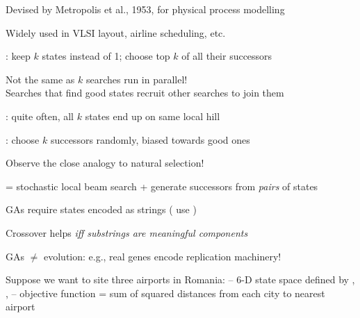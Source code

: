 \documentclass{article}
\begin{document}
\begin{huge}

Devised by Metropolis et al., 1953, for physical process modelling

Widely used in VLSI layout, airline scheduling, etc.



: keep $k$ states instead of 1; choose top $k$ of all their successors

Not the same as $k$ searches run in parallel!\\
Searches that find good states recruit other searches to join them

: quite often, all $k$ states end up on same local hill

: choose $k$ successors randomly, biased towards good ones

Observe the close analogy to natural selection!


= stochastic local beam search + generate successors from \emph{pairs} of states

\vspace*{0.2in}

\textwidth
{}


GAs require states encoded as strings ( use )

Crossover helps \emph{iff substrings are meaningful components}

\vspace*{0.2in}

\textwidth
{}

GAs $\neq$ evolution: e.g., real genes encode replication machinery!


Suppose we want to site three airports in Romania:\al
-- 6-D state space defined by , , \al
-- objective function  = \nl
   sum of squared distances from each city to nearest airport


\end{huge}
\end{document}
